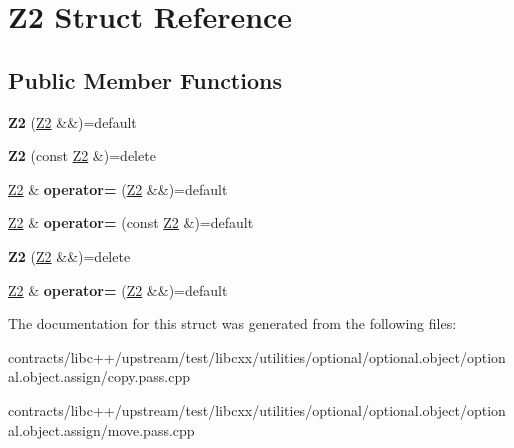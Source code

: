 \hypertarget{struct_z2}{}\section{Z2 Struct Reference}
\label{struct_z2}
\subsection*{Public Member Functions}
\begin{DoxyCompactItemize}
\item 
\mbox{\label{struct_z2_ac68ac81ef3e26185090db096c2c57bfe}} 
{\bfseries Z2} (\mbox{\hyperlink{struct_z2}{Z2}} \&\&)=default
\item 
\mbox{\label{struct_z2_ab5528ed0c65f15100947fa20a72d6447}} 
{\bfseries Z2} (const \mbox{\hyperlink{struct_z2}{Z2}} \&)=delete
\item 
\mbox{\label{struct_z2_a3f3e6e4cb330130239ef2a3646df880d}} 
\mbox{\hyperlink{struct_z2}{Z2}} \& {\bfseries operator=} (\mbox{\hyperlink{struct_z2}{Z2}} \&\&)=default
\item 
\mbox{\label{struct_z2_a00f4772397f3a6ce3ac9020dcbae5341}} 
\mbox{\hyperlink{struct_z2}{Z2}} \& {\bfseries operator=} (const \mbox{\hyperlink{struct_z2}{Z2}} \&)=default
\item 
\mbox{\label{struct_z2_a11ca7eb97d196cddedb35fddf2b4322c}} 
{\bfseries Z2} (\mbox{\hyperlink{struct_z2}{Z2}} \&\&)=delete
\item 
\mbox{\label{struct_z2_a3f3e6e4cb330130239ef2a3646df880d}} 
\mbox{\hyperlink{struct_z2}{Z2}} \& {\bfseries operator=} (\mbox{\hyperlink{struct_z2}{Z2}} \&\&)=default
\end{DoxyCompactItemize}


The documentation for this struct was generated from the following files\+:\begin{DoxyCompactItemize}
\item 
contracts/libc++/upstream/test/libcxx/utilities/optional/optional.\+object/optional.\+object.\+assign/copy.\+pass.\+cpp\item 
contracts/libc++/upstream/test/libcxx/utilities/optional/optional.\+object/optional.\+object.\+assign/move.\+pass.\+cpp\end{DoxyCompactItemize}
